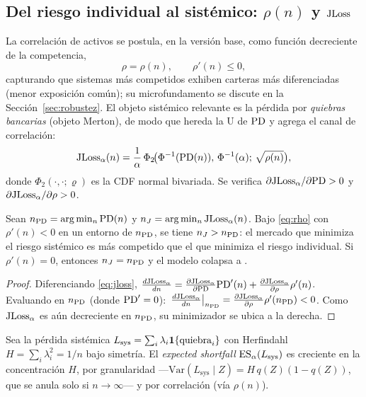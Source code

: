 \subsection{Del riesgo individual al sistémico: \texorpdfstring{$\rho(n)$ y $\mathrm{JLoss}$}{rho(n) y JLoss}}
La correlación de activos se postula, en la versión base, como función decreciente de la competencia,
\begin{equation}
\rho=\rho(n),\qquad \rho'(n)\le 0,
\label{eq:rho}
\end{equation}
capturando que sistemas más competidos exhiben carteras más diferenciadas (menor exposición común); su microfundamento se discute en la Sección~\ref{sec:robustez}. El objeto sistémico relevante es la pérdida por \textit{quiebras bancarias} (objeto Merton), de modo que hereda la U de $\mathrm{PD}$ y agrega el canal de correlación:
\begin{equation}
\mathrm{JLoss}_\alpha(n)=\frac{1}{\alpha}\,\Phi_2\!\big(\Phi^{-1}(\mathrm{PD}(n)),\,\Phi^{-1}(\alpha);\,\sqrt{\rho(n)}\big),
\label{eq:jloss}
\end{equation}
donde $\Phi_2(\cdot,\cdot;\varrho)$ es la CDF normal bivariada. Se verifica $\partial\mathrm{JLoss}_\alpha/\partial\mathrm{PD}>0$ y $\partial\mathrm{JLoss}_\alpha/\partial\rho>0$.

\begin{proposition}\label{prop:shift}
Sean $n_{\mathrm{PD}}=\arg\min_n\mathrm{PD}(n)$ y $n_J=\arg\min_n\mathrm{JLoss}_\alpha(n)$. Bajo \eqref{eq:rho} con $\rho'(n)<0$ en un entorno de $n_{\mathrm{PD}}$, se tiene $n_J>n_{\mathrm{PD}}$: el mercado que minimiza el riesgo sistémico es más competido que el que minimiza el riesgo individual. Si $\rho'(n)=0$, entonces $n_J=n_{\mathrm{PD}}$ y el modelo colapsa a \citet{MMR2010}.
\end{proposition}
\begin{proof}
Diferenciando \eqref{eq:jloss}, $\frac{d\mathrm{JLoss}_\alpha}{dn}=\frac{\partial\mathrm{JLoss}_\alpha}{\partial\mathrm{PD}}\mathrm{PD}'(n)+\frac{\partial\mathrm{JLoss}_\alpha}{\partial\rho}\rho'(n)$. Evaluando en $n_{\mathrm{PD}}$ (donde $\mathrm{PD}'=0$): $\left.\frac{d\mathrm{JLoss}_\alpha}{dn}\right|_{n_{\mathrm{PD}}}=\frac{\partial\mathrm{JLoss}_\alpha}{\partial\rho}\rho'(n_{\mathrm{PD}})<0$. Como $\mathrm{JLoss}_\alpha$ es aún decreciente en $n_{\mathrm{PD}}$, su minimizador se ubica a la derecha.
\end{proof}

\begin{proposition}\label{prop:granular}
Sea la pérdida sistémica $L_{\text{sys}}=\sum_i\lambda_i\mathbf{1}\{\text{quiebra}_i\}$ con Herfindahl $H=\sum_i\lambda_i^2=1/n$ bajo simetría. El \textit{expected shortfall} $\mathrm{ES}_\alpha(L_{\text{sys}})$ es creciente en la concentración $H$, por granularidad ---$\mathrm{Var}(L_{\text{sys}}\mid Z)=H\,q(Z)(1-q(Z))$, que se anula solo si $n\to\infty$--- y por correlación (vía $\rho(n)$).
\end{proposition}

